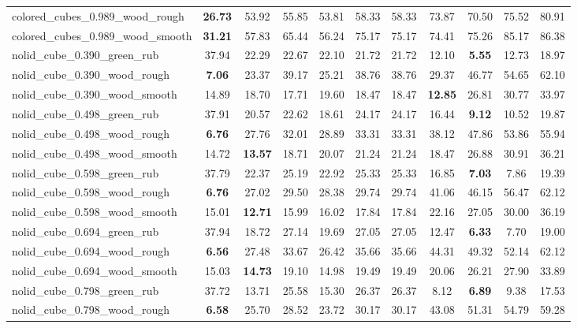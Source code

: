 \begin{table}[H]
{\begin{tabular}{l cccccccccc}
        colored\_cubes\_0.989\_wood\_rough & \textbf{26.73} & 53.92 & 55.85 & 53.81 & 58.33 & 58.33 & 73.87 & 70.50 & 75.52 & 80.91 \\
        colored\_cubes\_0.989\_wood\_smooth & \textbf{31.21} & 57.83 & 65.44 & 56.24 & 75.17 & 75.17 & 74.41 & 75.26 & 85.17 & 86.38 \\
        nolid\_cube\_0.390\_green\_rub & 37.94 & 22.29 & 22.67 & 22.10 & 21.72 & 21.72 & 12.10 & \textbf{5.55} & 12.73 & 18.97 \\
        nolid\_cube\_0.390\_wood\_rough & \textbf{7.06} & 23.37 & 39.17 & 25.21 & 38.76 & 38.76 & 29.37 & 46.77 & 54.65 & 62.10 \\
        nolid\_cube\_0.390\_wood\_smooth & 14.89 & 18.70 & 17.71 & 19.60 & 18.47 & 18.47 & \textbf{12.85} & 26.81 & 30.77 & 33.97 \\
        nolid\_cube\_0.498\_green\_rub & 37.91 & 20.57 & 22.62 & 18.61 & 24.17 & 24.17 & 16.44 & \textbf{9.12} & 10.52 & 19.87 \\
        nolid\_cube\_0.498\_wood\_rough & \textbf{6.76} & 27.76 & 32.01 & 28.89 & 33.31 & 33.31 & 38.12 & 47.86 & 53.86 & 55.94 \\
        nolid\_cube\_0.498\_wood\_smooth & 14.72 & \textbf{13.57} & 18.71 & 20.07 & 21.24 & 21.24 & 18.47 & 26.88 & 30.91 & 36.21 \\
        nolid\_cube\_0.598\_green\_rub & 37.79 & 22.37 & 25.19 & 22.92 & 25.33 & 25.33 & 16.85 & \textbf{7.03} & 7.86 & 19.39 \\
        nolid\_cube\_0.598\_wood\_rough & \textbf{6.76} & 27.02 & 29.50 & 28.38 & 29.74 & 29.74 & 41.06 & 46.15 & 56.47 & 62.12 \\
        nolid\_cube\_0.598\_wood\_smooth & 15.01 & \textbf{12.71} & 15.99 & 16.02 & 17.84 & 17.84 & 22.16 & 27.05 & 30.00 & 36.19 \\
        nolid\_cube\_0.694\_green\_rub & 37.94 & 18.72 & 27.14 & 19.69 & 27.05 & 27.05 & 12.47 & \textbf{6.33} & 7.70 & 19.00 \\
        nolid\_cube\_0.694\_wood\_rough & \textbf{6.56} & 27.48 & 33.67 & 26.42 & 35.66 & 35.66 & 44.31 & 49.32 & 52.14 & 62.12 \\
        nolid\_cube\_0.694\_wood\_smooth & 15.03 & \textbf{14.73} & 19.10 & 14.98 & 19.49 & 19.49 & 20.06 & 26.21 & 27.90 & 33.89 \\
        nolid\_cube\_0.798\_green\_rub & 37.72 & 13.71 & 25.58 & 15.30 & 26.37 & 26.37 & 8.12 & \textbf{6.89} & 9.38 & 17.53 \\
        nolid\_cube\_0.798\_wood\_rough & \textbf{6.58} & 25.70 & 28.52 & 23.72 & 30.17 & 30.17 & 43.08 & 51.31 & 54.79 & 59.28 \\

\end{tabular}}
\end{table}
